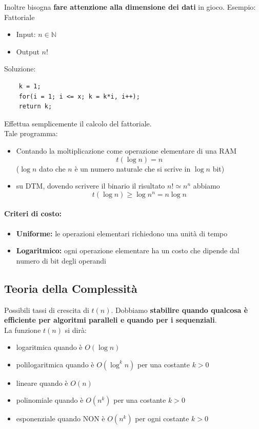 \newpage

Inoltre bisogna \textbf{fare attenzione alla dimensione dei dati} in gioco. Esempio: Fattoriale
\begin{itemize}
	\item Input: $n \in \mathbb{N}$
	\item Output $n!$
\end{itemize}
Soluzione: 
\begin{lstlisting}
	k = 1; 
	for(i = 1; i <= x; k = k*i, i++);
	return k;
\end{lstlisting}
Effettua semplicemente il calcolo del fattoriale.\\

Tale programma:
\begin{itemize}
	\item Contando la moltiplicazione come operazione elementare di una RAM 
	$$ t(\log n) = n $$
	($\log n$ dato che $n$ è un numero naturale che si scrive in $\log n$ bit)
	\item su DTM, dovendo scrivere il binario il risultato $n! \simeq n^n$ abbiamo
	$$ t(\log n) \geq \log n^n = n \log n $$
\end{itemize}

\paragraph{Criteri di costo: }
\begin{itemize}
	\item \textbf{Uniforme:} le operazioni elementari richiedono una unità di tempo 
	\item \textbf{Logaritmico:} ogni operazione elementare ha un costo che dipende dal numero di bit degli operandi
\end{itemize}

\newpage

\subsection*{Teoria della Complessità}

Possibili tassi di crescita di $t(n)$. Dobbiamo \textbf{stabilire quando qualcosa è efficiente per algoritmi paralleli e quando per i sequenziali}.\\

La funzione $t(n)$ si dirà: 
\begin{itemize}
	\item logaritmica quando è $O(\log n)$
	\item polilogaritmica quando è $O(\log^k n)$ per una costante $k>0$
	\item lineare quando è $O(n)$
	\item polinomiale quando è $O(n^k)$ per una costante $k>0$
	\item esponenziale quando NON è $O(n^k)$ per ogni costante $k>0$ 
\end{itemize}

